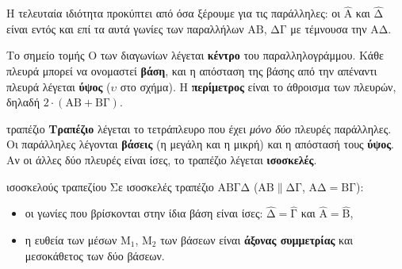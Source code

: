 Η τελευταία ιδιότητα προκύπτει από όσα ξέρουμε για τις παράλληλες: οι $\hat{\mathrm{Α}}$ και $\hat{\mathrm{Δ}}$ είναι εντός και επί τα αυτά γωνίες των παραλλήλων $\mathrm{ΑΒ}$, $\mathrm{ΔΓ}$ με τέμνουσα την $\mathrm{ΑΔ}$.

Το σημείο τομής $\mathrm{Ο}$ των διαγωνίων λέγεται \textbf{κέντρο} του παραλληλογράμμου. Κάθε πλευρά μπορεί να ονομαστεί \textbf{βάση}, και η απόσταση της βάσης από την απέναντι πλευρά λέγεται \textbf{ύψος} ($\upsilon$ στο σχήμα). Η \textbf{περίμετρος} είναι το άθροισμα των πλευρών, δηλαδή $2\cdot(\mathrm{ΑΒ}+\mathrm{ΒΓ})$.

\begin{orismos}{τραπέζιο}
\textbf{Τραπέζιο} λέγεται το τετράπλευρο που έχει \emph{μόνο δύο} πλευρές παράλληλες. Οι παράλληλες λέγονται \textbf{βάσεις} (η μεγάλη και η μικρή) και η απόστασή τους \textbf{ύψος}. Αν οι άλλες δύο πλευρές είναι ίσες, το τραπέζιο λέγεται \textbf{ισοσκελές}.
\end{orismos}

\begin{center}
\end{center}

\begin{idiotita}{ισοσκελούς τραπεζίου}
Σε ισοσκελές τραπέζιο $\mathrm{ΑΒΓΔ}$ ($\mathrm{ΑΒ}\parallel\mathrm{ΔΓ}$, $\mathrm{ΑΔ}=\mathrm{ΒΓ}$):
\begin{itemize}[leftmargin=1.2em,itemsep=0.3ex,topsep=2pt]
\item οι γωνίες που βρίσκονται στην ίδια βάση είναι ίσες: $\hat{\mathrm{Δ}}=\hat{\mathrm{Γ}}$ και $\hat{\mathrm{Α}}=\hat{\mathrm{Β}}$,
\item η ευθεία των μέσων $\mathrm{Μ}_1$, $\mathrm{Μ}_2$ των βάσεων είναι \textbf{άξονας συμμετρίας} και μεσοκάθετος των δύο βάσεων.
\end{itemize}
\end{idiotita}

